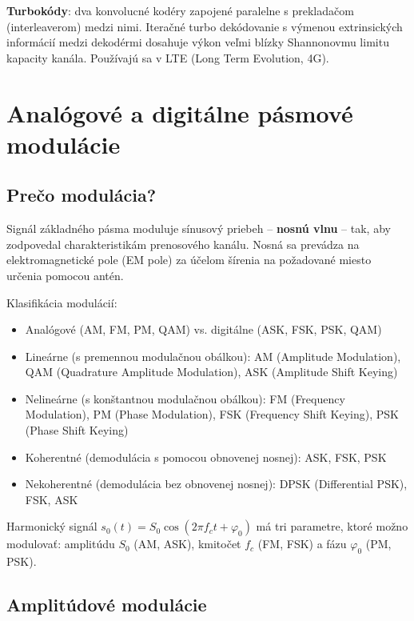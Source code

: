 \textbf{Turbokódy}: dva konvolucné kodéry zapojené paralelne s prekladačom
(interleaverom) medzi nimi. Iteračné turbo dekódovanie s výmenou extrinsických
informácií medzi dekodérmi dosahuje výkon veľmi blízky Shannonovmu limitu kapacity
kanála. Používajú sa v LTE (Long Term Evolution, 4G).

\chapter{Analógové a digitálne pásmové modulácie}

\section{Prečo modulácia?}

Signál základného pásma moduluje sínusový priebeh -- \textbf{nosnú vlnu} -- tak,
aby zodpovedal charakteristikám prenosového kanálu. Nosná sa prevádza na
elektromagnetické pole (EM pole) za účelom šírenia na požadované miesto určenia
pomocou antén.

Klasifikácia modulácií:
\begin{itemize}
    \item Analógové (AM, FM, PM, QAM) vs. digitálne (ASK, FSK, PSK, QAM)
    \item Lineárne (s premennou modulačnou obálkou): AM (Amplitude Modulation),
        QAM (Quadrature Amplitude Modulation), ASK (Amplitude Shift Keying)
    \item Nelineárne (s konštantnou modulačnou obálkou): FM (Frequency Modulation),
        PM (Phase Modulation), FSK (Frequency Shift Keying), PSK (Phase Shift Keying)
    \item Koherentné (demodulácia s pomocou obnovenej nosnej): ASK, FSK, PSK
    \item Nekoherentné (demodulácia bez obnovenej nosnej): DPSK (Differential PSK),
        FSK, ASK
\end{itemize}

Harmonický signál $s_0(t) = S_0\cos(2\pi f_c t + \varphi_0)$ má tri parametre,
ktoré možno modulovať: amplitúdu $S_0$ (AM, ASK), kmitočet $f_c$ (FM, FSK)
a fázu $\varphi_0$ (PM, PSK).

\section{Amplitúdové modulácie}

